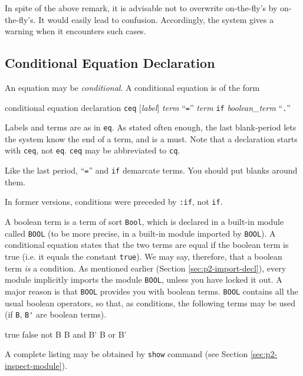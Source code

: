\documentclass[a4paper]{memoir}
\begin{document}
\begin{warning}
  In spite of the above remark, it is advisable not to
  overwrite on-the-fly's by on-the-fly's. It would easily
  lead to confusion. Accordingly, the system gives a warning when
  it encounters such cases.
\end{warning}

\subsection{Conditional Equation Declaration}\label{sec:p2-eq-decl-cond}

An equation may be {\em conditional}.
A conditional equation is of the form

\begin{bsyntax} conditional equation declaration  \Hline
{}
\texttt{ceq} $[$\textit{label}$]$ \textit{term} ``\texttt{=}'' \textit{term} \texttt{if} \textit{boolean\_term} ``\texttt{.}''
\end{bsyntax}

Labels and terms are as in \verb|eq|.
As stated often enough, the last blank-period lets the system know the
end of a term, and is a must. Note that a declaration starts with
\verb|ceq|, not \verb|eq|. \verb|ceq| may be abbreviated to \verb|cq|.

\begin{warning}
  Like the last period, ``\verb|=|'' and \verb|if| demarcate terms. You
  should put blanks around them.
\end{warning}

\begin{warning}
  In former versions, conditions were preceded by \verb|:if|, not \verb|if|.
\end{warning}

A boolean term is a term of sort \verb|Bool|,
which is declared in
a built-in module called \verb|BOOL| (to be more precise, in a built-in
module imported by \verb|BOOL|).
A conditional equation states that the two terms are equal if
the boolean term is true (i.e. it equals the constant \verb|true|).
We may say, therefore, that a boolean term {\em is} a condition.
 As mentioned earlier
(Section \ref{sec:p2-import-decl}), every
module implicitly imports the module \verb|BOOL|, unless you have locked
it out. A major reason is that \verb|BOOL| provides you with boolean terms.
\verb|BOOL| contains all the usual boolean operators, so that,
as conditions, the following terms may be used
(if \verb|B|, \verb|B'| are boolean terms).
\begin{vvtm}
\begin{ccode}
  true
  false
  not B
  B and B'
  B or B'
\end{ccode}
\end{vvtm}
A complete listing may be obtained by \verb|show| command
(see Section \ref{sec:p2-inspect-module}).
\end{document}
